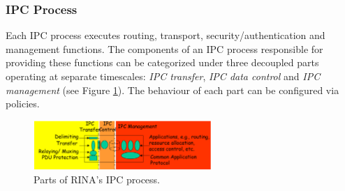             \subsubsection{IPC Process}

                Each IPC process executes routing, transport, security/authentication and management functions. The components of an IPC process responsible for providing these functions can be categorized under three decoupled parts operating at separate timescales: \emph{IPC transfer}, \emph{IPC data control} and \emph{IPC management} (see Figure \ref{fig:rina_ipcp}). The behaviour of each part can be configured via policies.

                \begin{figure}[H]
                    \begin{center}
                        \includegraphics[width=0.6\textwidth]{fig/archs_rina-ipcp.png}
                      \caption{Parts of RINA's IPC process.}
                      \label{fig:rina_ipcp}
                    \end{center}
                \end{figure}

